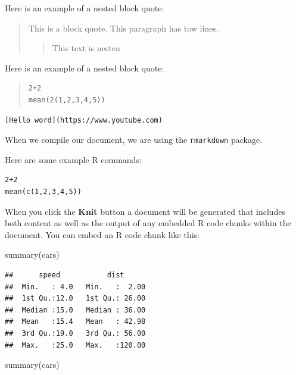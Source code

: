 \documentclass[
]{article}
\newenvironment{Shaded}{\begin{snugshade}}{\end{snugshade}}
\newcommand{\FunctionTok}[1]{\textcolor[rgb]{0.00,0.00,0.00}{#1}}
\newcommand{\NormalTok}[1]{#1}
\begin{document}
Here is an example of a nested block quote:

\begin{quote}
This is a block quote. This paragraph has tow lines.

\begin{quote}
This text is nesten
\end{quote}
\end{quote}

Here is an example of a nested block quote:

\begin{quote}
\begin{verbatim}
2+2
mean(2(1,2,3,4,5))
\end{verbatim}
\end{quote}

\begin{verbatim}
[Hello word](https://www.youtube.com)
\end{verbatim}

When we compile our document, we are using the \texttt{rmarkdown}
package.

Here are some example R commands:

\begin{verbatim}
2+2
mean(c(1,2,3,4,5))
\end{verbatim}

When you click the \textbf{Knit} button a document will be generated
that includes both content as well as the output of any embedded R code
chunks within the document. You can embed an R code chunk like this:

\begin{Shaded}
\begin{Highlighting}[]
\FunctionTok{summary}\NormalTok{(cars)}
\end{Highlighting}
\end{Shaded}

\begin{verbatim}
##      speed           dist       
##  Min.   : 4.0   Min.   :  2.00  
##  1st Qu.:12.0   1st Qu.: 26.00  
##  Median :15.0   Median : 36.00  
##  Mean   :15.4   Mean   : 42.98  
##  3rd Qu.:19.0   3rd Qu.: 56.00  
##  Max.   :25.0   Max.   :120.00
\end{verbatim}

\begin{Shaded}
\begin{Highlighting}[]
\FunctionTok{summary}\NormalTok{(cars)}
\end{Highlighting}
\end{Shaded}
\end{document}
